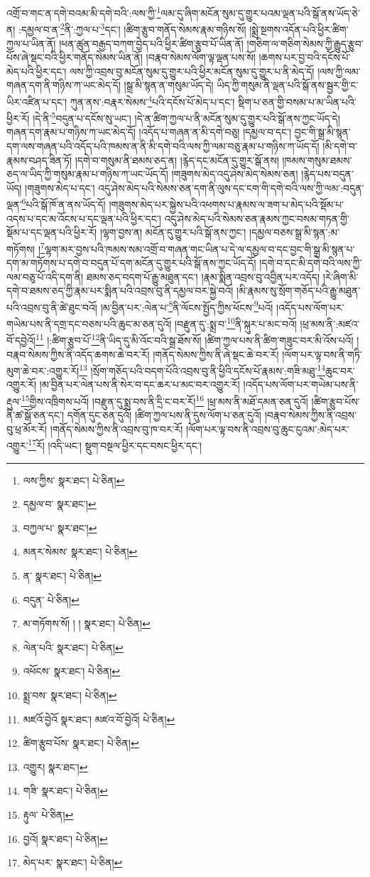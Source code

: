འགྲོ་བ་གང་ན་དགེ་བའམ་མི་དགེ་བའི་:ལས་ཀྱི་\footnote{ལས་ཀྱིས་  སྣར་ཐང་།  པེ་ཅིན། }ལམ་དུ་ཞིག་མངོན་སུམ་དུ་གྱུར་པའམ་ལྡན་པའི་སྒོ་ནས་ཡོད་ཅེ་ན། :དམྱལ་བ་ན་\footnote{དམྱལ་བ་  སྣར་ཐང་། }ནི་:ཀྱལ་པ་\footnote{བཀྱལ་པ་  སྣར་ཐང་། }དང་། །ཚིག་རྩུབ་གནོད་སེམས་རྣམ་གཉིས་སོ། །སྨྲེ་སྔགས་འདོན་པའི་ཕྱིར་ཚིག་ཀྱལ་པ་ཡིན་ནོ། །ཕན་ཚུན་བརྒྱད་བཀག་བྱེད་པའི་ཕྱིར་ཚིག་རྩུབ་པོ་ཡིན་ནོ། །གཅིག་ལ་གཅིག་སེམས་ཀྱི་རྒྱུད་རྩུབ་པོས་ཞེ་སྡང་བའི་ཕྱིར་གནོད་སེམས་ཡིན་ནོ། །བརྣབ་སེམས་ལོག་ལྟ་ལྡན་པས་སོ། །ཆགས་པར་བྱ་བའི་དངོས་པོ་མེད་པའི་ཕྱིར་དང་། ལས་ཀྱི་འབྲས་བུ་མངོན་སུམ་དུ་གྱུར་པའི་ཕྱིར་མངོན་སུམ་དུ་གྱུར་པ་ནི་མེད་དོ། །ལས་ཀྱི་ལམ་གཞན་དག་ནི་གཉིས་ཀ་ཡང་མེད་དོ། །སྒྲ་མི་སྙན་ན་གསུམ་ཡོད་དེ། ཡིད་ཀྱི་གསུམ་ནི་ལྡན་པའི་སྒོ་ནས་སྦྱར་གྱི་ང་ཡིར་འཛིན་པ་དང་། ཀུན་ནས་:བརྣར་སེམས་\footnote{མནར་སེམས་  སྣར་ཐང་།  པེ་ཅིན། }པའི་དངོས་པོ་མེད་པ་དང་། སྡིག་པ་ཅན་གྱི་བསམ་པ་མ་ཡིན་པའི་ཕྱིར་རོ། །དེ་ནི་\footnote{ན་  སྣར་ཐང་།  པེ་ཅིན། }བདུན་པ་དངོས་སུ་ཡང་། །དེ་ན་ཚིག་ཀྱལ་པ་ནི་མངོན་སུམ་དུ་གྱུར་པའི་སྒོ་ནས་ཀྱང་ཡོད་དེ། གཞན་དག་རྣམ་པ་གཉིས་ཀ་ཡང་མེད་དོ། །འདོད་པ་གཞན་ན་མི་དགེ་བཅུ། །དམྱལ་བ་དང་། བྱང་གི་སྒྲ་མི་སྙན་དག་ལས་གཞན་པའི་འདོད་པའི་ཁམས་ན་ནི་མི་དགེ་བའི་ལས་ཀྱི་ལམ་བཅུ་རྣམ་པ་གཉིས་ཀ་ཡོད་དོ། །མི་དགེ་བ་རྣམས་བཤད་ཟིན་ཏོ། །དགེ་བ་གསུམ་ནི་ཐམས་ཅད་ན། །རྙེད་དང་མངོན་དུ་གྱུར་སྒོ་ནས། །ཁམས་གསུམ་ཐམས་ཅད་ལ་ཡིད་ཀྱི་གསུམ་རྣམ་པ་གཉིས་ཀ་ཡང་ཡོད་དོ། །གཟུགས་མེད་འདུ་ཤེས་མེད་སེམས་ཅན། །རྙེད་པས་བདུན་ཡོད། །གཟུགས་མེད་པ་དང་། འདུ་ཤེས་མེད་པའི་སེམས་ཅན་དག་ནི་ལུས་དང་ངག་གི་དགེ་བའི་ལས་ཀྱི་ལམ་:བདུན་ལྡན་\footnote{བདུན་  པེ་ཅིན། }པའི་སྒོ་ཁོ་ན་ནས་ཡོད་དོ། །གཟུགས་མེད་པར་སྐྱེས་པའི་འཕགས་པ་རྣམས་ལ་ཟག་པ་མེད་པའི་སྡོམ་པ་འདས་པ་དང་མ་འོངས་པ་དང་ལྡན་པའི་ཕྱིར་དང་། འདུ་ཤེས་མེད་པའི་སེམས་ཅན་རྣམས་ཀྱང་བསམ་གཏན་གྱི་སྡོམ་པ་དང་ལྡན་པའི་ཕྱིར་རོ། །ལྷག་བྱས་ན། མངོན་དུ་གྱུར་པའི་སྒོ་ནས་ཀྱང་། །དམྱལ་བཅས་སྒྲ་མི་སྙན་:མ་གཏོགས། །\footnote{མ་གཏོགས་སོ། ། །  སྣར་ཐང་།  པེ་ཅིན། }ལྷག་མར་བྱས་པའི་ཁམས་སམ་འགྲོ་བ་གཞན་གང་ཡིན་པ་དེ་ལ་དམྱལ་བ་དང་བྱང་གི་སྒྲ་མི་སྙན་པ་དག་མ་གཏོགས་པ་དགེ་བ་བདུན་པོ་དག་མངོན་དུ་གྱུར་པའི་སྒོ་ནས་ཀྱང་ཡོད་དོ། །དགེ་བ་དང་མི་དགེ་བའི་ལས་ཀྱི་ལམ་བཅུ་པོ་འདི་དག་ནི། ཐམས་ཅད་བདག་པོ་རྒྱུ་མཐུན་དང་། །རྣམ་སྨིན་འབྲས་བུ་འབྱིན་པར་འདོད། །རེ་ཞིག་མི་དགེ་བ་ཐམས་ཅད་ཀྱི་རྣམ་པར་སྨིན་པའི་འབྲས་བུ་ནི་དམྱལ་བར་སྐྱེ་བའོ། །མི་རྣམས་སུ་སྲོག་གཅོད་པའི་རྒྱུ་མཐུན་པའི་འབྲས་བུ་ནི་ཚེ་ཐུང་བའོ། །མ་བྱིན་པར་:ལེན་པ་\footnote{ལེན་པའི་  སྣར་ཐང་།  པེ་ཅིན། }ནི་ལོངས་སྤྱོད་ཀྱིས་ཕོངས་\footnote{འཕོངས་  སྣར་ཐང་།  པེ་ཅིན། }པའོ། །འདོད་པས་ལོག་པར་གཡེམ་པས་ནི་དགྲ་དང་བཅས་པའི་ཆུང་མ་ཅན་དུའོ། །བརྫུན་དུ་:སྨྲ་བ་\footnote{སྨྲ་བས་  སྣར་ཐང་།  པེ་ཅིན། }ནི་སྐུར་པ་མང་བའོ། །ཕྲ་མས་ནི་:མཛའ་བོ་དབྱེའོ།\footnote{མཛའོ་བྱེའོ  སྣར་ཐང་། མཛའ་བོ་བྱེའོ།  པེ་ཅིན། } །:ཚིག་རྩུབ་པོ་\footnote{ཚིག་རྩུབ་པོས་  སྣར་ཐང་།  པེ་ཅིན། }ནི་ཡིད་དུ་མི་འོང་བའི་སྒྲ་ཐོས་སོ། །ཚིག་ཀྱལ་པས་ནི་ཚིག་གཟུང་བར་མི་འོས་པའོ། །བརྣབ་སེམས་ཀྱིས་ནི་འདོད་ཆགས་ཆེ་བར་རོ། །གནོད་སེམས་ཀྱིས་ནི་ཞེ་སྡང་ཆེ་བར་རོ། །ལོག་པར་ལྟ་བས་ནི་གཏི་མུག་ཆེ་བར་:འགྱུར་རོ།\footnote{འགྱུར།  སྣར་ཐང་། } །སྲོག་གཅོད་པའི་བདག་པོའི་འབྲས་བུ་ནི་ཕྱིའི་དངོས་པོ་རྣམས་:གཟི་མཐུ་\footnote{གཟི་  སྣར་ཐང་།  པེ་ཅིན། }ཆུང་བར་འགྱུར་རོ། །མ་བྱིན་པར་ལེན་པས་ནི་སེར་བ་དང་ཆར་པ་མང་བར་འགྱུར་རོ། །འདོད་པས་ལོག་པར་གཡེམ་པས་ནི་རྡུལ་\footnote{རྟུལ་  པེ་ཅིན། }གྱིས་འཁྲིགས་པའོ། །བརྫུན་དུ་སྨྲ་བས་ནི་དྲི་ང་བར་རོ།\footnote{བྱའོ།  སྣར་ཐང་།  པེ་ཅིན། } །ཕྲ་མས་ནི་མཐོ་དམན་ཅན་དུའོ། །ཚིག་རྩུབ་པོས་ནི་ཚ་སྒོ་ཅན་དང་། དགོན་དུང་ཅན་དུའོ། །ཚིག་ཀྱལ་པས་ནི་དུས་ལོག་པ་ཅན་དུའོ། །བརྣབ་སེམས་ཀྱིས་ནི་འབྲས་བུ་ཕྲ་མོར་རོ། །གནོད་སེམས་ཀྱིས་ནི་འབྲས་བུ་ཁ་བར་རོ། །ལོག་པར་ལྟ་བས་ནི་འབྲས་བུ་ཆུང་ངུའམ་:མེད་པར་འགྱུར་\footnote{མེད་པར་  སྣར་ཐང་།  པེ་ཅིན། }རོ། །འདི་ཡང་། སྡུག་བསྔལ་ཕྱིར་དང་བསང་ཕྱིར་དང་། 